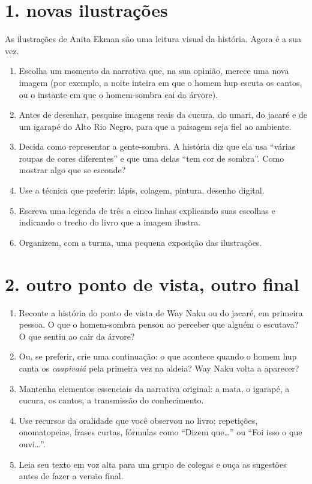 \section{1. novas ilustrações}

As ilustrações de Anita Ekman são uma leitura visual da história. Agora
é a sua vez.

\begin{enumerate}[label=\arabic*.]
\item Escolha um momento da narrativa que, na sua opinião, merece uma
nova imagem (por exemplo, a noite inteira em que o homem hup escuta os
cantos, ou o instante em que o homem-sombra cai da árvore).
\item Antes de desenhar, pesquise imagens reais da cucura, do umari, do
jacaré e de um igarapé do Alto Rio Negro, para que a paisagem seja fiel
ao ambiente.
\item Decida como representar a gente-sombra. A história diz que ela usa
``várias roupas de cores diferentes'' e que uma delas ``tem cor de
sombra''. Como mostrar algo que se esconde?
\item Use a técnica que preferir: lápis, colagem, pintura, desenho
digital.
\item Escreva uma legenda de três a cinco linhas explicando suas
escolhas e indicando o trecho do livro que a imagem ilustra.
\item Organizem, com a turma, uma pequena exposição das ilustrações.
\end{enumerate}

\section{2. outro ponto de vista, outro final}

\begin{enumerate}[label=\arabic*.]
\item Reconte a história do ponto de vista de Way Naku ou do jacaré, em
primeira pessoa. O que o homem-sombra pensou ao perceber que alguém o
escutava? O que sentiu ao cair da árvore?
\item Ou, se preferir, crie uma continuação: o que acontece quando o
homem hup canta os \textit{caapivaiá} pela primeira vez na aldeia? Way
Naku volta a aparecer?
\item Mantenha elementos essenciais da narrativa original: a mata, o
igarapé, a cucura, os cantos, a transmissão do conhecimento.
\item Use recursos da oralidade que você observou no livro: repetições,
onomatopeias, frases curtas, fórmulas como ``Dizem que\ldots'' ou ``Foi
isso o que ouvi\ldots''.
\item Leia seu texto em voz alta para um grupo de colegas e ouça as
sugestões antes de fazer a versão final.
\end{enumerate}

